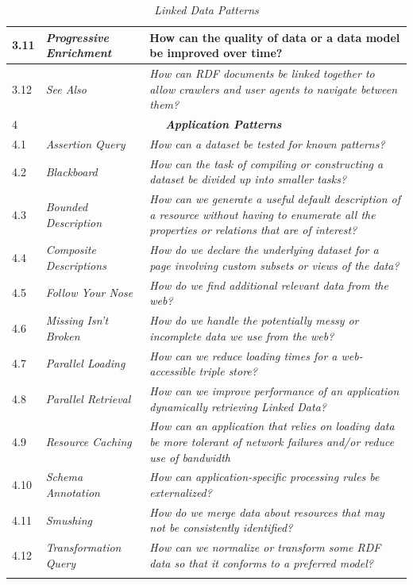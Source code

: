 \begin{longtable}[c]{|l|p{7cm}|p{8cm}|}
  3.11 &  \textit{Progressive Enrichment} &  How can the quality of data or a data model be improved over time? \\ \hline      
  3.12 &  \textit{See Also} & \textit{How can RDF documents be linked together to allow crawlers and user agents to navigate between them?} \\ \hline    
        4& \multicolumn{2}{|c|}{\textbf{\textit{Application Patterns}}}\\ \hline
  4.1 &  \textit{Assertion Query} & \textit{How can a dataset be tested for known patterns?} \\ \hline    
  4.2 &  \textit{Blackboard} &  \textit{How can the task of compiling or constructing a dataset be divided up into smaller tasks?}\\ \hline    
  4.3 &  \textit{Bounded Description} & \textit{How can we generate a useful default description of a resource without having to enumerate all the properties or relations that are of interest?} \\ \hline     
  4.4 &  \textit{Composite Descriptions} &  \textit{How do we declare the underlying dataset for a page involving custom subsets or views of the data?}\\ \hline    
  4.5 &  \textit{Follow Your Nose} &  \textit{How do we find additional relevant data from the web?} \\ \hline    
  4.6 &  \textit{Missing Isn't Broken} &  \textit{How do we handle the potentially messy or incomplete data we use from the web?} \\ \hline    
  4.7 &  \textit{Parallel Loading} &  \textit{How can we reduce loading times for a web-accessible triple store?} \\ \hline     
  4.8 &  \textit{Parallel Retrieval} & \textit{ How can we improve performance of an application dynamically retrieving Linked Data?} \\ \hline     
  4.9 &  \textit{Resource Caching} &  \textit{How can an application that relies on loading data be more tolerant of network failures and/or reduce use of bandwidth} \\ \hline    
  4.10 &  \textit{Schema Annotation} & \textit{How can application-specific processing rules be externalized?} \\ \hline    
  4.11 &  \textit{Smushing} &  \textit{How do we merge data about resources that may not be consistently identified?} \\ \hline
  4.12 &  \textit{Transformation Query} & \textit{How can we normalize or transform some RDF data so that it conforms to a preferred model?} \\ \hline        
 
\hline
\caption{\textit{Linked Data Patterns}}\label{table:linkeddata-patterns}\\    
\end{longtable}

